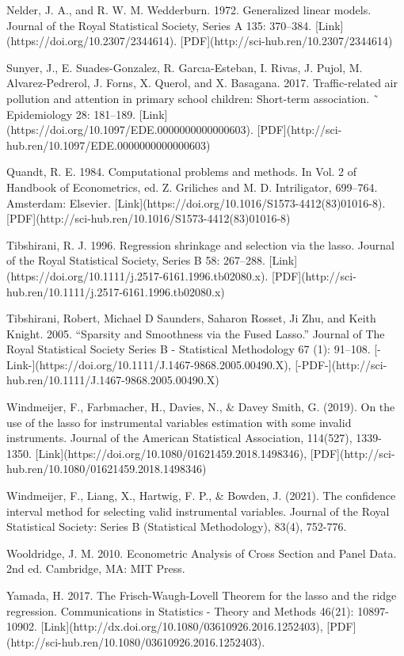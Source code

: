 {Nelder, J. A., and R. W. M. Wedderburn. 1972. Generalized linear models. Journal of the Royal Statistical Society,
Series A 135: 370–384. [Link](https://doi.org/10.2307/2344614). [PDF](http://sci-hub.ren/10.2307/2344614)

Sunyer, J., E. Suades-Gonzalez, R. Garcıa-Esteban, I. Rivas, J. Pujol, M. Alvarez-Pedrerol, J. Forns, X. Querol, and
X. Basagana. 2017. Traffic-related air pollution and attention in primary school children: Short-term association. ˜
Epidemiology 28: 181–189. [Link](https://doi.org/10.1097/EDE.0000000000000603).
[PDF](http://sci-hub.ren/10.1097/EDE.0000000000000603)

Quandt, R. E. 1984. Computational problems and methods. In Vol. 2 of Handbook of Econometrics, ed. Z. Griliches
and M. D. Intriligator, 699–764. Amsterdam: Elsevier. [Link](https://doi.org/10.1016/S1573-4412(83)01016-8). [PDF](http://sci-hub.ren/10.1016/S1573-4412(83)01016-8)

Tibshirani, R. J. 1996. Regression shrinkage and selection via the lasso. Journal of the Royal Statistical Society,
Series B 58: 267–288. [Link](https://doi.org/10.1111/j.2517-6161.1996.tb02080.x). [PDF](http://sci-hub.ren/10.1111/j.2517-6161.1996.tb02080.x)

Tibshirani, Robert, Michael D Saunders, Saharon Rosset, Ji Zhu, and Keith Knight. 2005. “Sparsity and Smoothness via the Fused Lasso.” Journal of The Royal Statistical Society Series B - Statistical Methodology 67 (1): 91–108. [-Link-](https://doi.org/10.1111/J.1467-9868.2005.00490.X), [-PDF-](http://sci-hub.ren/10.1111/J.1467-9868.2005.00490.X)

Windmeijer, F., Farbmacher, H., Davies, N., \& Davey Smith, G. (2019). On the use of the lasso for instrumental variables estimation with some invalid instruments. Journal of the American Statistical Association, 114(527), 1339-1350. [Link](https://doi.org/10.1080/01621459.2018.1498346), [PDF](http://sci-hub.ren/10.1080/01621459.2018.1498346)

Windmeijer, F., Liang, X., Hartwig, F. P., \& Bowden, J. (2021). The confidence interval method for selecting valid instrumental variables. Journal of the Royal Statistical Society: Series B (Statistical Methodology), 83(4), 752-776.


Wooldridge, J. M. 2010. Econometric Analysis of Cross Section and Panel Data. 2nd ed. Cambridge, MA: MIT Press.

Yamada, H. 2017.  The Frisch-Waugh-Lovell Theorem for the lasso and the ridge regression.  Communications in Statistics - Theory and Methods 46(21): 10897-10902. [Link](http://dx.doi.org/10.1080/03610926.2016.1252403), [PDF](http://sci-hub.ren/10.1080/03610926.2016.1252403).

}
